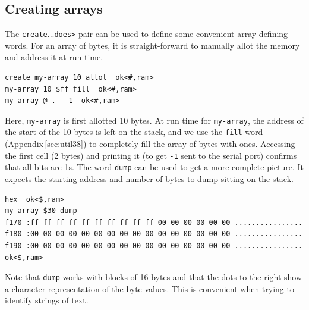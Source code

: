 \documentclass[12pt,a4paper]{article}
\begin{document}
\subsection{Creating arrays}
\label{sec:creating-arrays}
%
The \verb!create!...\verb!does>! pair can be used to define some convenient 
array-defining words.
For an array of bytes, it is straight-forward to manually allot the
memory and address it at run time.
\begin{verbatim}
create my-array 10 allot  ok<#,ram>
my-array 10 $ff fill  ok<#,ram>
my-array @ .  -1  ok<#,ram>
\end{verbatim}
Here, \verb!my-array! is first allotted 10 bytes.
At run time for \verb!my-array!, the address of the start of the 10 bytes is left on 
the stack, and we use the \verb!fill! word (Appendix\,\ref{sec:util38}) 
to completely fill the array of bytes with ones.
Accessing the first cell (2 bytes) and printing it (to get \verb!-1! sent to the serial port)
confirms that all bits are 1s.
The word \verb!dump! can be used to get a more complete picture.
It expects the starting address and number of bytes to dump sitting on the stack.
\begin{verbatim}
hex  ok<$,ram>
my-array $30 dump 
f170 :ff ff ff ff ff ff ff ff ff ff 00 00 00 00 00 00 ................
f180 :00 00 00 00 00 00 00 00 00 00 00 00 00 00 00 00 ................
f190 :00 00 00 00 00 00 00 00 00 00 00 00 00 00 00 00 ................ ok<$,ram>
\end{verbatim}
Note that \verb!dump! works with blocks of 16 bytes and that the dots to the right
show a character representation of the byte values.
This is convenient when trying to identify strings of text.
\end{document}
